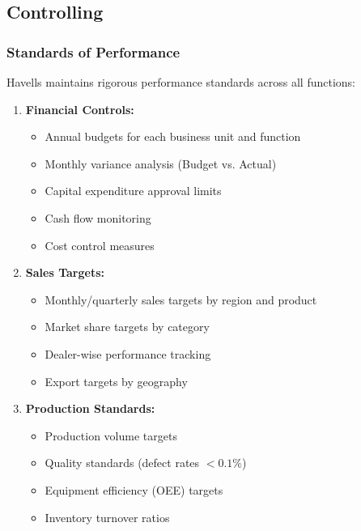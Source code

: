 \documentclass[12pt,a4paper]{article}
\begin{document}
\subsection{Controlling}

\subsubsection{Standards of Performance}

Havells maintains rigorous performance standards across all functions:

\begin{enumerate}[leftmargin=*]
    \item \textbf{Financial Controls:}
    \begin{itemize}
        \item Annual budgets for each business unit and function
        \item Monthly variance analysis (Budget vs. Actual)
        \item Capital expenditure approval limits
        \item Cash flow monitoring
        \item Cost control measures
    \end{itemize}
    
    \item \textbf{Sales Targets:}
    \begin{itemize}
        \item Monthly/quarterly sales targets by region and product
        \item Market share targets by category
        \item Dealer-wise performance tracking
        \item Export targets by geography
    \end{itemize}
    
    \item \textbf{Production Standards:}
    \begin{itemize}
        \item Production volume targets
        \item Quality standards (defect rates $< 0.1\%$)
        \item Equipment efficiency (OEE) targets
        \item Inventory turnover ratios
    \end{itemize}
    

\end{enumerate}
\end{document}
